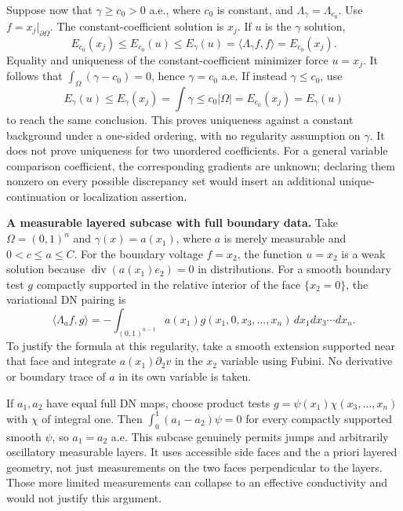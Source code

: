 \documentclass[11pt]{article}
\begin{document}
Suppose now that $\gamma\geq c_0>0$ a.e., where $c_0$ is constant, and
$\Lambda_\gamma=\Lambda_{c_0}$.  Use $f=x_j|_{\partial\Omega}$.
The constant-coefficient solution is $x_j$.  If $u$ is the $\gamma$ solution,
\[
 E_{c_0}(x_j)\leq E_{c_0}(u)\leq E_\gamma(u)
 =\langle\Lambda_\gamma f,f\rangle=E_{c_0}(x_j).
\]
Equality and uniqueness of the constant-coefficient minimizer force $u=x_j$.
It follows that $\int_\Omega(\gamma-c_0)=0$, hence $\gamma=c_0$ a.e.
If instead $\gamma\leq c_0$, use
\[
 E_\gamma(u)\leq E_\gamma(x_j)=\int\gamma
 \leq c_0|\Omega|=E_{c_0}(x_j)=E_\gamma(u)
\]
to reach the same conclusion.  This proves uniqueness against a constant
background under a one-sided ordering, with no regularity assumption on
$\gamma$.  It does not prove uniqueness for two unordered coefficients.
For a general variable comparison coefficient, the corresponding gradients
are unknown; declaring them nonzero on every possible discrepancy set would
insert an additional unique-continuation or localization assertion.

\textbf{A measurable layered subcase with full boundary data.}
Take $\Omega=(0,1)^n$ and $\gamma(x)=a(x_1)$, where $a$ is merely measurable
and $0<c\leq a\leq C$.  For the boundary voltage $f=x_2$, the function
$u=x_2$ is a weak solution because
$\operatorname{div}(a(x_1)e_2)=0$ in distributions.
For a smooth boundary test $g$ compactly supported in the relative interior
of the face $\{x_2=0\}$, the variational DN pairing is
\[
 \langle\Lambda_a f,g\rangle
 =-\int_{(0,1)^{n-1}}a(x_1)g(x_1,0,x_3,\ldots,x_n)
                                      \,dx_1dx_3\cdots dx_n.
\]
To justify the formula at this regularity, take a smooth extension supported
near that face and integrate $a(x_1)\partial_2v$ in the $x_2$ variable using
Fubini.  No derivative or boundary trace of $a$ in its own variable is taken.

If $a_1,a_2$ have equal full DN maps, choose product tests
$g=\psi(x_1)\chi(x_3,\ldots,x_n)$ with $\chi$ of integral one.
Then $\int_0^1(a_1-a_2)\psi=0$ for every compactly supported smooth $\psi$,
so $a_1=a_2$ a.e.  This subcase genuinely permits jumps and arbitrarily
oscillatory measurable layers.  It uses accessible side faces and the a priori
layered geometry, not just measurements on the two faces perpendicular to
the layers.  Those more limited measurements can collapse to an effective
conductivity and would not justify this argument.
\end{document}
